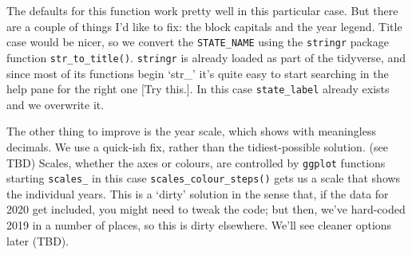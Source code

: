 \documentclass[
]{book}
\begin{document}
The defaults for this function work pretty well in this particular case. But there are a couple of things I'd like to fix: the block capitals and the year legend. Title case would be nicer, so we convert the \texttt{STATE\_NAME} using the \texttt{stringr} package function \texttt{str\_to\_title()}. \texttt{stringr} is already loaded as part of the tidyverse, and since most of its functions begin `str\_' it's quite easy to start searching in the help pane for the right one {[}Try this.{]}. In this case \texttt{state\_label} already exists and we overwrite it.

The other thing to improve is the year scale, which shows with meaningless decimals. We use a quick-ish fix, rather than the tidiest-possible solution. (see TBD) Scales, whether the axes or colours, are controlled by \texttt{ggplot} functions starting \texttt{scales\_} in this case \texttt{scales\_colour\_steps()} gets us a scale that shows the individual years. This is a `dirty' solution in the sense that, if the data for 2020 get included, you might need to tweak the code; but then, we've hard-coded 2019 in a number of places, so this is dirty elsewhere. We'll see cleaner options later (TBD).
\end{document}
